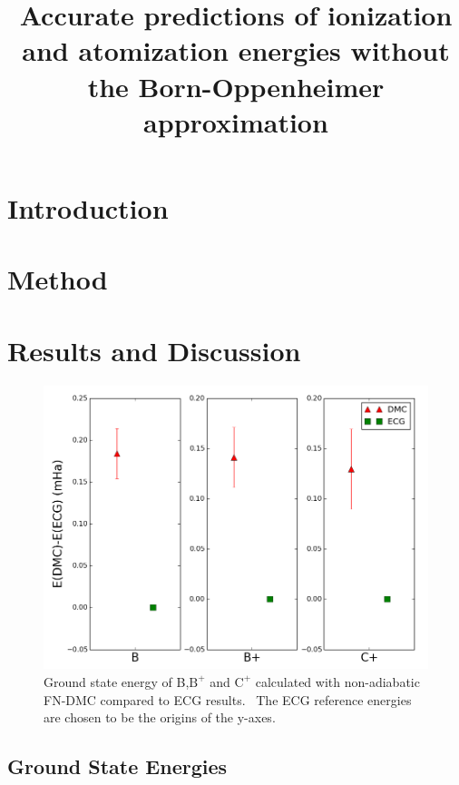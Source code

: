 \documentclass[pra,superscriptaddress,groupedaddress,twocolumn]{revtex4}
\begin{document}
\title{Accurate predictions of ionization and atomization energies without the Born-Oppenheimer approximation}


\maketitle

\section{Introduction}


\section{Method}


\section{Results and Discussion}


\begin{figure}
\centering
\includegraphics[scale=.4]{Figures/atom-ECG}
\caption{Ground state energy of B,$\text{B}^+$ and $\text{C}^+$ calculated with non-adiabatic FN-DMC compared to ECG results.~\cite{Bubin_B,Bubin_B+,Bubin_C+} The ECG reference energies are chosen to be the origins of the y-axes.}
\end{figure}

\subsection{Ground State Energies}

\end{document}

